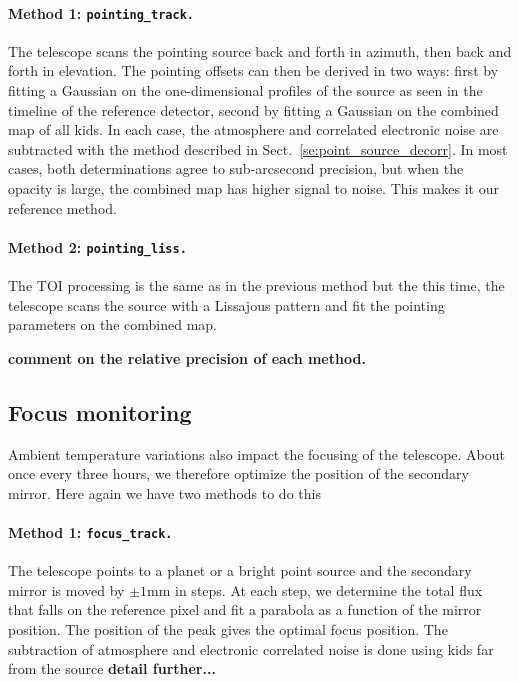 \paragraph{Method 1: {\tt pointing\_track.}} The telescope scans the
pointing source back and forth in azimuth, then back and forth in elevation. The
pointing offsets can then be derived in two ways: first by fitting a Gaussian on
the one-dimensional profiles of the source as seen in the timeline of the
reference detector, second by fitting a Gaussian on the combined map of all
kids. In each case, the atmosphere and correlated electronic noise are
subtracted with the method described in Sect.~\ref{se:point_source_decorr}. In
most cases, both determinations agree to sub-arcsecond precision, but when the
opacity is large, the combined map has higher signal to noise. This makes it our
reference method.

\paragraph{Method 2: {\tt pointing\_liss.}} The TOI processing is the same as in the
previous method but the this time, the telescope scans the source with a
Lissajous pattern and fit the pointing parameters on the combined map.

{\bf comment on the relative precision of each method.}

\subsection{Focus monitoring}
\label{se:focus}

Ambient temperature variations also impact the focusing of the telescope. About
once every three hours, we therefore optimize the position of the secondary
mirror. Here again we have two methods to do this

\paragraph{Method 1: {\tt focus\_track.}} The telescope points to a planet or a
bright point source and the secondary mirror is moved by $\pm 1$mm in steps. At
each step, we determine the total flux that falls on the reference pixel and fit
a parabola as a function of the mirror position. The position of the peak gives
the optimal focus position. The subtraction of atmosphere and
electronic correlated noise is done using kids far from the source {\bf detail
  further...}

